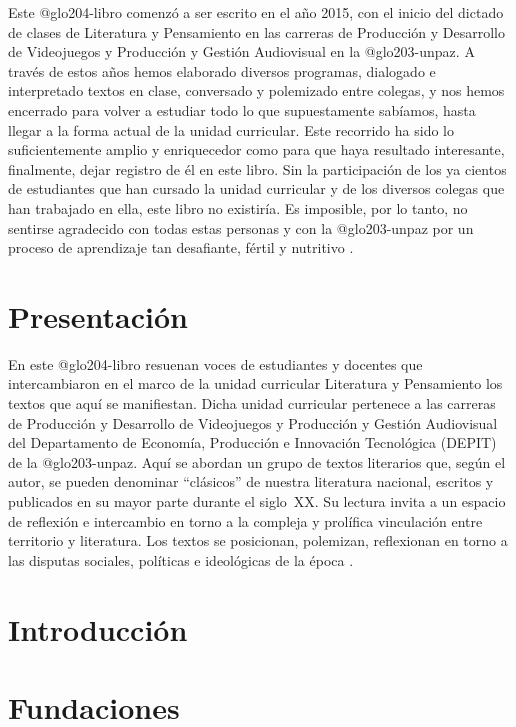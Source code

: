 Este \gls{@glo204-libro} comenzó a ser escrito en el año 2015, con el inicio del dictado de clases de Literatura y Pensamiento en las carreras de Producción y Desarrollo de Videojuegos y Producción y Gestión Audiovisual en la \gls{@glo203-unpaz}. A través de estos años hemos elaborado diversos programas, dia\-logado e interpretado textos en clase, conversado y polemizado entre colegas, y nos hemos encerrado para volver a estudiar todo lo que supuestamente sabíamos, hasta llegar a la forma actual de la unidad curricular. Este recorrido ha sido lo suficientemente amplio y enriquecedor como para que haya resultado interesante, finalmente, dejar registro de él en este libro. Sin la participación de los ya cientos de estudiantes que han cursado la unidad curricular y de los diversos colegas que han trabajado en ella, este libro no exis\-tiría. Es imposible, por lo tanto, no sentirse agradecido con todas estas personas y con la \gls{@glo203-unpaz} por un proceso de aprendizaje tan desafiante, fértil y nutritivo \parencite{@3187-WELLS2014}.

\chapter{Presentación}

En este \gls{@glo204-libro} resuenan voces de estudiantes y docentes que intercambiaron en el marco de la unidad curricular Literatura y Pensamiento los textos que aquí se manifiestan. Dicha unidad curricular pertenece a las carreras de Producción y Desarrollo de Videojuegos y Producción y Gestión Audiovisual del Departamento de Economía, Producción e Innovación Tecnológica (DEPIT) de la \gls{@glo203-unpaz}. Aquí se abordan un grupo de textos literarios que, según el autor, se pueden denominar \enquote{clásicos} de nuestra literatura nacional, escritos y publicados en su mayor parte durante el siglo~XX. Su lectura invita a un espacio de reflexión e intercambio en torno a la compleja y prolífica vinculación entre territorio y literatura. Los textos se posicionan, polemizan, reflexionan en torno a las disputas sociales, políticas e ideológicas de la época \parencite{@3187-WELLS2014}.

\chapter{Introducción}

\mainmatter

\chapter{Fundaciones}


